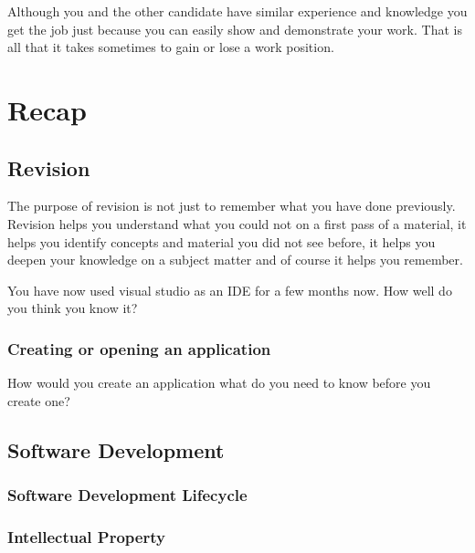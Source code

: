 \documentclass[
]{book}
\begin{document}
Although you and the other candidate have similar experience and knowledge you get the job just because you can easily show and demonstrate your work. That is all that it takes sometimes to gain or lose a work position.

\hypertarget{recap}{%
\chapter{Recap}\label{recap}}

\hypertarget{revision}{%
\section{Revision}\label{revision}}

The purpose of revision is not just to remember what you have done previously. Revision helps you understand what you could not on a first pass of a material, it helps you identify concepts and material you did not see before, it helps you deepen your knowledge on a subject matter and of course it helps you remember.

You have now used visual studio as an IDE for a few months now. How well do you think you know it?

\hypertarget{creating-or-opening-an-application}{%
\subsection{Creating or opening an application}\label{creating-or-opening-an-application}}

How would you create an application what do you need to know before you create one?

\hypertarget{software-development}{%
\section{Software Development}\label{software-development}}

\hypertarget{software-development-lifecycle}{%
\subsection{Software Development Lifecycle}\label{software-development-lifecycle}}

\hypertarget{intellectual-property}{%
\subsection{Intellectual Property}\label{intellectual-property}}
\end{document}
